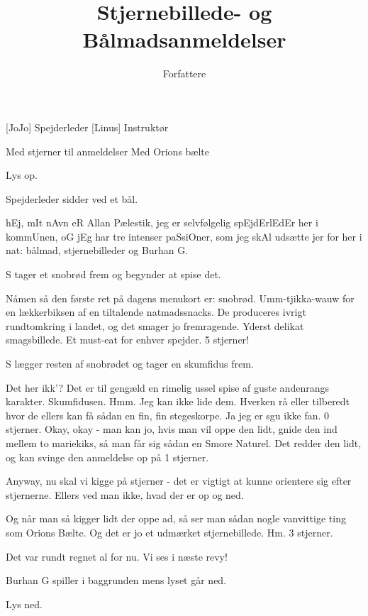 \documentclass[a4paper,11pt]{article}
\title{Stjernebillede- og Bålmadsanmeldelser}
\author{Forfattere}  %
\begin{document}
\maketitle

\begin{roles}
[JoJo] Spejderleder
[Linus] Instruktør
\end{roles}

\begin{props}
 Med stjerner til anmeldelser 
 Med Orions bælte 

\end{props}

\begin{sketch}


\scene Lys op.

\scene Spejderleder sidder ved et bål.

 hEj, mIt nAvn eR Allan Pælestik, jeg er selvfølgelig spEjdErlEdEr her i kommUnen, oG jEg har tre intenser paSsiOner, som jeg skAl udsætte jer for her i nat: bålmad, stjernebilleder og Burhan G.

\scene S tager et snobrød frem og begynder at spise det.

 Nåmen så den første ret på dagens menukort er: snobrød. Umm-tjikka-wauw for en lækkerbiksen af en tiltalende natmadssnacks. De produceres ivrigt rundtomkring i landet, og det smager jo fremragende. Yderst delikat smagsbillede. Et must-eat for enhver spejder. 5 stjerner!

\scene S lægger resten af snobrødet og tager en skumfidus frem.

 Det her ikk'? Det er til gengæld en rimelig ussel spise af guste andenrangs karakter. Skumfidusen. Hmm. Jeg kan ikke lide dem. Hverken rå eller tilberedt hvor de ellers kan få sådan en fin, fin stegeskorpe. Ja jeg er sgu ikke fan. 0 stjerner. Okay, okay - man kan jo, hvis man vil oppe den lidt, gnide den ind mellem to mariekiks, så man får sig sådan en Smore Naturel. Det redder den lidt, og kan svinge den anmeldelse op på 1 stjerner.



 Anyway, nu skal vi kigge på stjerner - det er vigtigt at kunne orientere sig efter stjernerne. Ellers ved man ikke, hvad der er op og ned.

 Og når man så kigger lidt der oppe ad, så ser man sådan nogle vanvittige ting som Orions Bælte. Og det er jo et udmærket stjernebillede. Hm. 3 stjerner.

 Det var rundt regnet al for nu. Vi ses i næste revy!

\scene Burhan G spiller i baggrunden mens lyset går ned.

\scene Lys ned.


\end{sketch}
\end{document}
